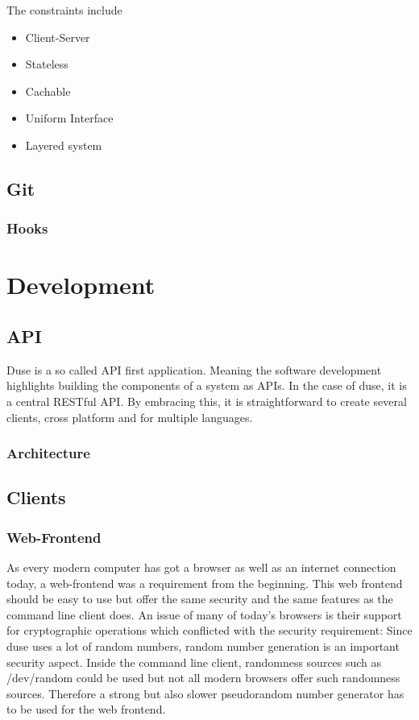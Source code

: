 The constraints include

\begin{itemize}
  \item{Client-Server}
  \item{Stateless}
  \item{Cachable}
  \item{Uniform Interface}
  \item{Layered system}
\end{itemize}

\section{Git}
\subsection{Hooks}

\chapter{Development}
\section{API}

Duse is a so called API first application. Meaning the software development
highlights building the components of a system as APIs. In the case of duse, it
is a central RESTful API. By embracing this, it is straightforward to create
several clients, cross platform and for multiple languages.

\subsection{Architecture}

\section{Clients}

\subsection{Web-Frontend}

As every modern computer has got a browser as well as an internet connection today,
a web-frontend was a requirement from the beginning. This web frontend should be
easy to use but offer the same security and the same features as the command line
client does. An issue of many of today's browsers is their support for
cryptographic operations which conflicted with the security requirement:
Since duse uses a lot of random numbers, random number generation is an important
security aspect. Inside the command line client, randomness sources such as
/dev/random could be used but not all modern browsers offer such randomness
sources. Therefore a strong but also slower pseudorandom number generator has
to be used for the web frontend.

